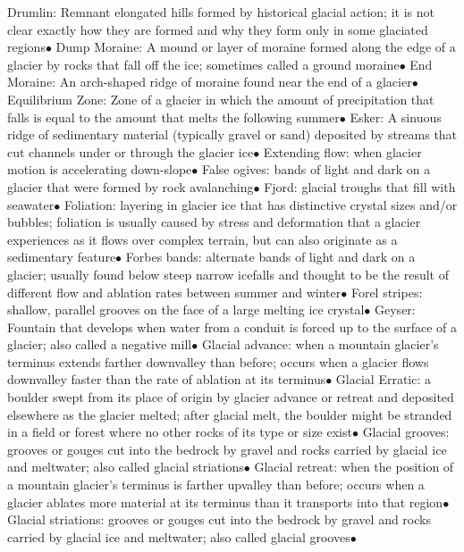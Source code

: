 \documentclass{article}
\newcommand{\ddd}{$\bullet$}
\begin{document}
\begin{multicols*}{4}
        Drumlin: Remnant elongated hills formed by historical glacial action; it is not clear exactly how they are formed and why they form only in some glaciated regions\ddd
        Dump Moraine: A mound or layer of moraine formed along the edge of a glacier by rocks that fall off the ice; sometimes called a ground moraine\ddd
        End Moraine: An arch-shaped ridge of moraine found near the end of a glacier\ddd
        Equilibrium Zone: Zone of a glacier in which the amount of precipitation that falls is equal to the amount that melts the following summer\ddd
        Esker: A sinuous ridge of sedimentary material (typically gravel or sand) deposited by streams that cut channels under or through the glacier ice\ddd
        Extending flow: when glacier motion is accelerating down-slope\ddd
        False ogives: bands of light and dark on a glacier that were formed by rock avalanching\ddd
        Fjord: glacial troughs that fill with seawater\ddd
        Foliation: layering in glacier ice that has distinctive crystal sizes and/or bubbles; foliation is usually caused by stress and deformation that a glacier experiences as it flows over complex terrain, but can also originate as a sedimentary feature\ddd
        Forbes bands: alternate bands of light and dark on a glacier; usually found below steep narrow icefalls and thought to be the result of different flow and ablation rates between summer and winter\ddd
        Forel stripes: shallow, parallel grooves on the face of a large melting ice crystal\ddd 
        Geyser: Fountain that develops when water from a conduit is forced up to the surface of a glacier; also called a negative mill\ddd
        Glacial advance: when a mountain glacier's terminus extends farther downvalley than before; occurs when a glacier flows downvalley faster than the rate of ablation at its terminus\ddd
        Glacial Erratic: a boulder swept from its place of origin by glacier advance or retreat and deposited elsewhere as the glacier melted; after glacial melt, the boulder might be stranded in a field or forest where no other rocks of its type or size exist\ddd
        Glacial grooves: grooves or gouges cut into the bedrock by gravel and rocks carried by glacial ice and meltwater; also called glacial striations\ddd
        Glacial retreat: when the position of a mountain glacier's terminus is farther upvalley than before; occurs when a glacier ablates more material at its terminus than it transports into that region\ddd
        Glacial striations: grooves or gouges cut into the bedrock by gravel and rocks carried by glacial ice and meltwater; also called glacial grooves\ddd

\end{multicols*}
\end{document}
